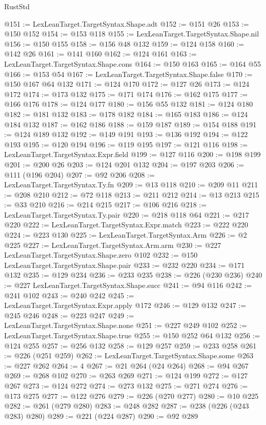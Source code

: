\begin{lexlean}{RustStd}
\begin{coremodule}
@151 := LexLeanTarget.TargetSyntax.Shape.adt
@152 := @151 @26
@153 := @150 @152
@154 := @153 @118
@155 := LexLeanTarget.TargetSyntax.Shape.nil
@156 := @150 @155
@158 := @156 @48 @132
@159 := @124 @158
@160 := @142 @26
@161 := @141 @160
@162 := @124 @161
@163 := LexLeanTarget.TargetSyntax.Shape.cons
@164 := @150 @163
@165 := @164 @55
@166 := @153 @54
@167 := LexLeanTarget.TargetSyntax.Shape.false
@170 := @150 @167 @64 @132
@171 := @124 @170
@172 := @127 @26
@173 := @124 @172
@174 := @173 @132
@175 := @171 @174
@176 := @162 @175
@177 := @166 @176
@178 := @124 @177
@180 := @156 @55 @132
@181 := @124 @180
@182 := @181 @132
@183 := @178 @182
@184 := @165 @183
@186 := @124 @184 @132
@187 := @162 @186
@188 := @159 @187
@189 := @154 @188
@191 := @124 @189 @132
@192 := @149 @191
@193 := @136 @192
@194 := @122 @193
@195 := @120 @194
@196 := @119 @195
@197 := @121 @116
@198 := LexLeanTarget.TargetSyntax.Expr.field
@199 := @127 @116
@200 := @198 @199
@201 := @200 @26
@203 := @124 @201 @132
@204 := @197 @203
@206 := @111 (@196 @204)
@207 := @92 @206
@208 := LexLeanTarget.TargetSyntax.Ty.fn
@209 := @13 @118
@210 := @209 @11
@211 := @208 @210
@212 := @72 @118
@213 := @211 @212
@214 := @13 @213
@215 := @33 @210
@216 := @214 @215
@217 := @106 @216
@218 := LexLeanTarget.TargetSyntax.Ty.pair
@220 := @218 @118 @64
@221 := @217 @220
@222 := LexLeanTarget.TargetSyntax.Expr.match
@223 := @222 @220
@224 := @223 @130
@225 := LexLeanTarget.TargetSyntax.Arm
@226 := @2 @225
@227 := LexLeanTarget.TargetSyntax.Arm.arm
@230 := @227 LexLeanTarget.TargetSyntax.Shape.zero @102
@232 := @150 LexLeanTarget.TargetSyntax.Shape.pair
@233 := @232 @220
@234 := @171 @132
@235 := @129 @234
@236 := @233 @235
@238 := @226 (@230 @236)
@240 := @227 LexLeanTarget.TargetSyntax.Shape.succ
@241 := @94 @116
@242 := @241 @102
@243 := @240 @242
@245 := LexLeanTarget.TargetSyntax.Expr.apply @172
@246 := @129 @132
@247 := @245 @246
@248 := @223 @247
@249 := LexLeanTarget.TargetSyntax.Shape.none
@251 := @227 @249 @102
@252 := LexLeanTarget.TargetSyntax.Shape.true
@255 := @150 @252 @64 @132
@256 := @124 @255
@257 := @256 @132
@258 := @129 @257
@259 := @233 @258
@261 := @226 (@251 @259)
@262 := LexLeanTarget.TargetSyntax.Shape.some
@263 := @227 @262
@264 := 4
@267 := @21 @264 (@24 @264)
@268 := @94 @267
@269 := @268 @102
@270 := @263 @269
@271 := @124 @199
@272 := @127 @267
@273 := @124 @272
@274 := @273 @132
@275 := @271 @274
@276 := @173 @275
@277 := @122 @276
@279 := @226 (@270 @277)
@280 := @10 @225
@282 := @261 (@279 @280)
@283 := @248 @282
@287 := @238 (@226 (@243 @283) @280)
@289 := @221 (@224 @287)
@290 := @92 @289

\end{coremodule}
\end{lexlean}
